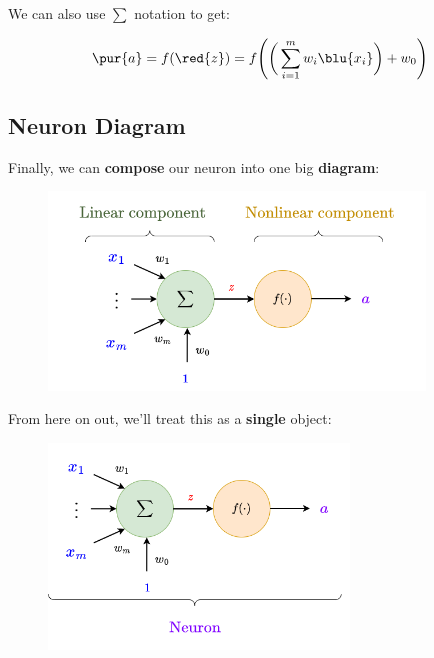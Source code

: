         
        We can also use $\sum$ notation to get:
        
        \begin{equation*}
            \pur{a} = f(\red{z}) = 
            f 
            \Bigg(
                \bigg( 
                    \sum_{i=1}^m w_i\blu{x_i} 
                \bigg) 
                + w_0 
            \Bigg)
        \end{equation*}
        
    \subsection{Neuron Diagram}
    
        Finally, we can \textbf{compose} our neuron into one big \textbf{diagram}:
        
        \begin{figure}[H]
            \centering
            \includegraphics[width=100mm,scale=0.4]{images/nn_images/labelled_neuron.png}
        \end{figure}
        
        From here on out, we'll treat this as a \textbf{single} object:
        
        \begin{figure}[H]
            \centering
            \includegraphics[width=80mm,scale=0.4]{images/nn_images/neuron_underbrace.png}
        \end{figure}
        

